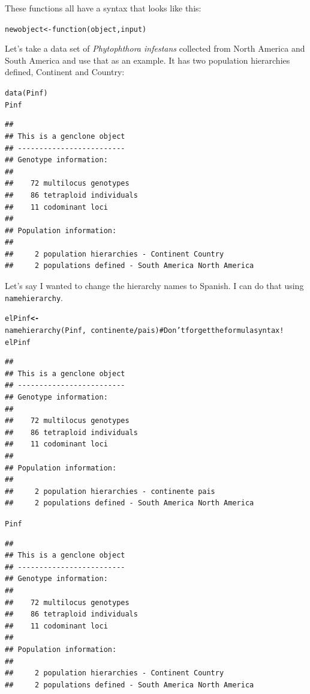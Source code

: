 \documentclass[letterpaper]{article}\usepackage[]{graphicx}\usepackage[]{color}
\makeatletter
\newcommand{\hlcom}[1]{\textcolor[rgb]{1,0.502,0}{#1}}%
\newcommand{\hlopt}[1]{\textcolor[rgb]{1,0,0.502}{\textbf{#1}}}%
\newcommand{\hlstd}[1]{\textcolor[rgb]{0,0,0}{#1}}%
\newcommand{\hlkwb}[1]{\textcolor[rgb]{0.502,0.502,0.753}{\textbf{#1}}}%
\newcommand{\hlkwd}[1]{\textcolor[rgb]{0,0.267,0.4}{#1}}%
\newenvironment{kframe}{%
 \def\at@end@of@kframe{}%
 \ifinner\ifhmode%
  \def\at@end@of@kframe{\end{minipage}}%
  \begin{minipage}{\columnwidth}%
 \fi\fi%
 \def\FrameCommand##1{\hskip\@totalleftmargin \hskip-\fboxsep
 \colorbox{shadecolor}{##1}\hskip-\fboxsep
     \hskip-\linewidth \hskip-\@totalleftmargin \hskip\columnwidth}%
 \MakeFramed {\advance\hsize-\width
   \@totalleftmargin\z@ \linewidth\hsize
   \@setminipage}}%
 {\par\unskip\endMakeFramed%
 \at@end@of@kframe}
\newenvironment{knitrout}{}{} %
\makeatother
\begin{document}
These functions all have a syntax that looks like this:
\begin{knitrout}\footnotesize
{}\color{fgcolor}\begin{kframe}
\begin{alltt}
newobject <- \hlkwd{function}(object, input)
\end{alltt}
\end{kframe}
\end{knitrout}

Let's take a data set of \textit{Phytophthora infestans} collected from North
America and South America and use that as an example. It has two population 
hierarchies defined, Continent and Country:
\begin{knitrout}\footnotesize
{}\color{fgcolor}\begin{kframe}
\begin{alltt}
\hlkwd{data}\hlstd{(Pinf)}
\hlstd{Pinf}
\end{alltt}
\begin{verbatim}
## 
## This is a genclone object
## -------------------------
## Genotype information:
## 
##    72 multilocus genotypes
##    86 tetraploid individuals
##    11 codominant loci
## 
## Population information:
## 
##     2 population hierarchies - Continent Country
##     2 populations defined - South America North America
\end{verbatim}
\end{kframe}
\end{knitrout}

\noindent
Let's say I wanted to change the hierarchy names to Spanish. I can do that using
\texttt{namehierarchy}.
\begin{knitrout}\footnotesize
{}\color{fgcolor}\begin{kframe}
\begin{alltt}
\hlstd{elPinf} \hlkwb{<-} \hlkwd{namehierarchy}\hlstd{(Pinf,} \hlopt{~}\hlstd{continente}\hlopt{/}\hlstd{pais)}  \hlcom{# Don't forget the formula syntax!}
\hlstd{elPinf}
\end{alltt}
\begin{verbatim}
## 
## This is a genclone object
## -------------------------
## Genotype information:
## 
##    72 multilocus genotypes
##    86 tetraploid individuals
##    11 codominant loci
## 
## Population information:
## 
##     2 population hierarchies - continente pais
##     2 populations defined - South America North America
\end{verbatim}
\begin{alltt}
\hlstd{Pinf}
\end{alltt}
\begin{verbatim}
## 
## This is a genclone object
## -------------------------
## Genotype information:
## 
##    72 multilocus genotypes
##    86 tetraploid individuals
##    11 codominant loci
## 
## Population information:
## 
##     2 population hierarchies - Continent Country
##     2 populations defined - South America North America
\end{verbatim}
\end{kframe}
\end{knitrout}
\end{document}

